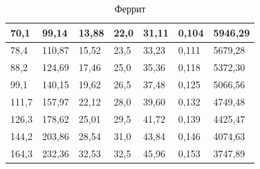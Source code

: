 \documentclass[a4paper,12pt]{article} %
\begin{document}
\begin{table}[h!]
\begin{tabular}{|l|l|l|l|l|l|l|}
		70,1                                      & 99,14                                                   & 13,88                                                 & 22,0                                     & 31,11                                                   & 0,104                        & 5946,29                                         \\ \hline
		78,4                                      & 110,87                                                  & 15,52                                                 & 23,5                                     & 33,23                                                   & 0,111                        & 5679,28                                         \\ \hline
		88,2                                     & 124,69                                                  & 17,46                                                 & 25,0                                     & 35,36                                                   & 0,118                        & 5372,30                                         \\ \hline
		99,1                                      & 140,15                                                  & 19,62                                                 & 26,5                                     & 37,48                                                   & 0,125                        & 5066,56                                         \\ \hline
		111,7                                     & 157,97                                                  & 22,12                                                 & 28,0                                     & 39,60                                                    & 0,132                        & 4749,48                                         \\ \hline
		126,3                                     & 178,62                                                  & 25,01                                                 & 29,5                                     & 41,72                                                   & 0,139                        & 4425,47                                         \\ \hline
		144,2                                     & 203,86                                                  & 28,54                                                 & 31,0                                     & 43,84                                                   & 0,146                        & 4074,63                                         \\ \hline
		164,3                                     & 232,36                                                  & 32,53                                                 & 32,5                                     & 45,96                                                   & 0,153                        & 3747,89                                         \\ \hline
	\end{tabular}
	\caption{Феррит}
\end{table}
\end{document}
